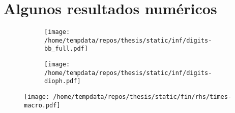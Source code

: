 \documentclass[aspectratio=169,professionalfonts]{beamer}
\begin{document}
\section{Algunos resultados numéricos}
\begin{frame}
	\begin{figure}[hbtp]
	  \centering
	  \begin{subfigure}{0.45\textwidth}
		\centering
		\texttt{[image: /home/tempdata/repos/thesis/static/inf/digits-bb\_full.pdf]}
	  \end{subfigure}
	  \hfill
	  \begin{subfigure}{0.45\textwidth}
		\centering
		\texttt{[image: /home/tempdata/repos/thesis/static/inf/digits-dioph.pdf]}
	  \end{subfigure}
	\end{figure}
\end{frame}

\begin{frame}
	\begin{figure}[hbtp]
		\centering
		\texttt{[image: /home/tempdata/repos/thesis/static/fin/rhs/times-macro.pdf]}
	\end{figure}
\end{frame}
\end{document}
